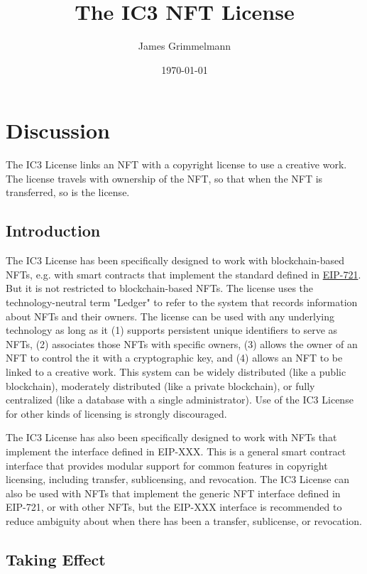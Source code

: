 \documentclass{article}
\title{The IC3 NFT License}
\author{James Grimmelmann}
\date{\today}
\begin{document}
\maketitle




\section{Discussion}

The IC3 License links an NFT with a copyright license to use a creative work. The license travels with ownership of the NFT, so that when the NFT is transferred, so is the license. 

\subsection{Introduction}

The IC3 License has been specifically designed to work with blockchain-based NFTs, e.g. with smart contracts that implement the standard defined in \href{https://eips.ethereum.org/EIPS/eip-721}{EIP-721}. But it is not restricted to blockchain-based NFTs. The license uses the technology-neutral term "Ledger" to refer to the system that records information about NFTs and their owners. The license can be used with any underlying technology as long as it (1) supports persistent unique identifiers to serve as NFTs, (2) associates those NFTs with specific owners, (3) allows the owner of an NFT to control the it with a cryptographic key, and (4) allows an NFT to be linked to a creative work. This system can be widely distributed (like a public blockchain), moderately distributed (like a private blockchain), or fully centralized (like a database with a single administrator). Use of the IC3 License for other kinds of licensing is strongly discouraged.

The IC3 License has also been specifically designed to work with NFTs that implement the interface defined in EIP-XXX. This is a general smart contract interface that provides modular support for common features in copyright licensing, including transfer, sublicensing, and revocation. The IC3 License can also be used with NFTs that implement the generic NFT interface defined in EIP-721, or with other NFTs, but the EIP-XXX interface is recommended to reduce ambiguity about when there has been a transfer, sublicense, or revocation.


\subsection{Taking Effect}
\end{document}
